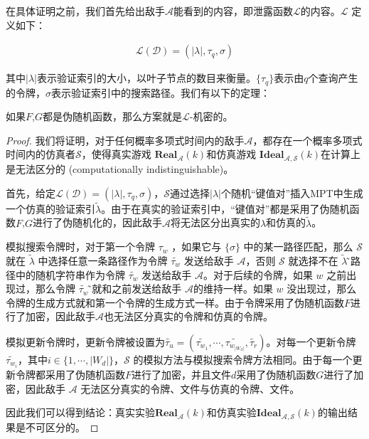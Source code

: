 在具体证明之前，我们首先给出敌手$\mathcal{A}$能看到的内容，即泄露函数$\mathcal{L}$的内容。$\mathcal{L}$ 定义如下：

\begin{align}
  \mathcal{L}(\mathcal{D})=(|\lambda|,{\tau}_q,{\sigma})
\end{align}

其中$|\lambda|$表示验证索引的大小，以叶子节点的数目来衡量。$\{\tau_q\}$表示由$q$个查询产生的令牌，$\sigma$表示验证索引中的搜索路径。我们有以下的定理：

\begin{theorem}
    如果$F$,$G$都是伪随机函数，那么方案\single 就是$\mathcal{L}$-机密的。
\end{theorem}

\begin{proof}
  我们将证明，对于任何概率多项式时间内的敌手$\mathcal{A}$，都存在一个概率多项式时间内的仿真者$\mathcal{S}$，使得真实游戏 $\mathbf{Real}_\mathcal{A}(k)$和仿真游戏 $\mathbf{Ideal}_\mathcal{A,S}(k)$在计算上是无法区分的 (computationally indistinguishable)。

  首先，给定$\mathcal{L}(\mathcal{D})=(|\lambda|,{\tau}_q,{\sigma})$，$\mathcal{S}$通过选择$|\lambda|$个随机“键值对”插入MPT中生成一个仿真的验证索引$\tilde{\lambda}$。由于在真实的验证索引中，“键值对”都是采用了伪随机函数$F$,$G$进行了伪随机化的，因此敌手$\mathcal{A}$将无法区分出真实的$\lambda$和仿真的$\tilde{\lambda}$。

  模拟搜索令牌时，对于第一个令牌 $\tau_w$ ，如果它与 $\{\sigma\}$ 中的某一路径匹配，那么 $\mathcal{S}$ 就在 $\tilde{\lambda}$ 中选择任意一条路径作为令牌 $\tilde{\tau_w}$ 发送给敌手 $\mathcal{A}$，否则 $\mathcal{S}$ 就选择不在 $\tilde{\lambda}$ ̃路径中的随机字符串作为令牌 $\tilde{\tau_w}$ 发送给敌手 $\mathcal{A}$。对于后续的令牌，如果 $w$ 之前出现过，那么令牌 $\tilde{\tau_w}$ ̃就和之前发送给敌手 $\mathcal{A}$的维持一样。如果 $w$ 没出现过，那么令牌的生成方式就和第一个令牌的生成方式一样。由于令牌采用了伪随机函数$F$进行了加密，因此敌手$\mathcal{A}$也无法区分真实的令牌和仿真的令牌。

  模拟更新令牌时，更新令牌被设置为$\tilde{\tau_u} = (\tilde{\tau_{w_1}},\cdots,\tilde{\tau_{w_{|W_d|}}},\tilde{\tau_r})$。对每一个更新令牌$\tilde{\tau_{w_i}}$，其中$i \in \{1,\cdots, |W_d|\}$，$\mathcal{S}$ 的模拟方法与模拟搜索令牌方法相同。由于每一个更新令牌都采用了伪随机函数$F$进行了加密，并且文件$d$采用了伪随机函数$G$进行了加密，因此敌手 $\mathcal{A}$ 无法区分真实的令牌、文件与仿真的令牌、文件。

  因此我们可以得到结论：真实实验$\mathbf{Real}_\mathcal{A}(k)$和仿真实验$\mathbf{Ideal}_\mathcal{A,S}(k)$的输出结果是不可区分的。
\end{proof}

